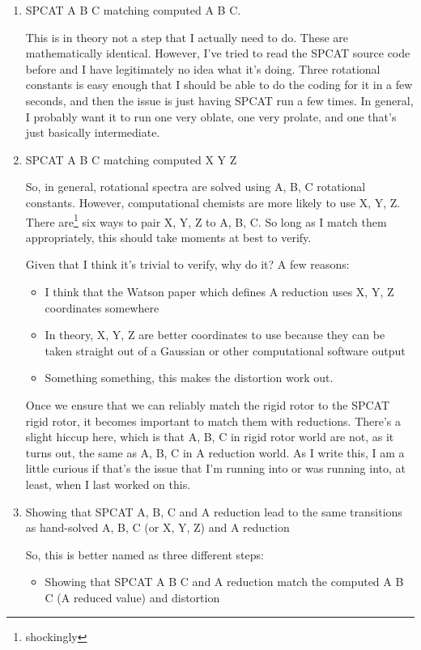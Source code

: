 \documentclass[12pt]{article}
\renewcommand{\,}{\textsuperscript{,}}
\begin{document}
\begin{enumerate}  
\item SPCAT A B C matching computed A B C.

This is in theory not a step that I actually need to do.  
These are mathematically identical.  
However, I've tried to read the SPCAT source code before and I have legitimately no idea what it's doing.  
Three rotational constants is easy enough that I should be able to do the coding for it in a few seconds, and then the issue is just having SPCAT run a few times.  
In general, I probably want it to run one very oblate, one very prolate, and one that's just basically intermediate.

\item SPCAT A B C matching computed X Y Z

So, in general, rotational spectra are solved using A, B, C rotational constants.  
However, computational chemists are more likely to use X, Y, Z.  
There are\footnote{shockingly} six ways to pair X, Y, Z to A, B, C.  
So long as I match them appropriately, this should take moments at best to verify.

Given that I think it's trivial to verify, why do it?  
A few reasons:  
\begin{itemize}  
\item I think that the Watson paper which defines A reduction uses X, Y, Z coordinates somewhere  
\item In theory, X, Y, Z are better coordinates to use because they can be taken straight out of a Gaussian or other computational software output  
\item Something something, this makes the distortion work out.  
\end{itemize}

Once we ensure that we can reliably match the rigid rotor to the SPCAT rigid rotor, it becomes important to match them with reductions.  
There's a slight hiccup here, which is that A, B, C in rigid rotor world are not, as it turns out, the same as A, B, C in A reduction world.  
As I write this, I am a little curious if that's the issue that I'm running into or was running into, at least, when I last worked on this.

\item Showing that SPCAT A, B, C and A reduction lead to the same transitions as hand-solved A, B, C (or X, Y, Z) and A reduction

So, this is better named as three different steps:  
\begin{itemize}  
\item Showing that SPCAT A B C and A reduction match the computed A B C (A reduced value) and distortion


\end{itemize}
\end{enumerate}
\end{document}
